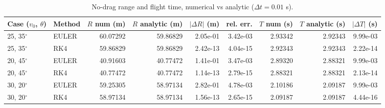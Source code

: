 \begin{table}[h]
\centering\small
\begin{tabular}{llrrrrrrr}
\hline
Case ($v_0$, $\theta$) & Method & $R$ num (m) & $R$ analytic (m) & $|\Delta R|$ (m) & rel. err. & $T$ num (s) & $T$ analytic (s) & $|\Delta T|$ (s) \\
\hline
25, 35$^\circ$ & EULER & 60.07292 & 59.86829 & 2.05e-01 & 3.42e-03 & 2.93342 & 2.92343 & 9.99e-03 \\
25, 35$^\circ$ & RK4 & 59.86829 & 59.86829 & 2.42e-13 & 4.04e-15 & 2.92343 & 2.92343 & 2.22e-14 \\
20, 45$^\circ$ & EULER & 40.91603 & 40.77472 & 1.41e-01 & 3.47e-03 & 2.89320 & 2.88321 & 9.99e-03 \\
20, 45$^\circ$ & RK4 & 40.77472 & 40.77472 & 1.14e-13 & 2.79e-15 & 2.88321 & 2.88321 & 2.13e-14 \\
30, 20$^\circ$ & EULER & 59.25305 & 58.97134 & 2.82e-01 & 4.78e-03 & 2.10186 & 2.09187 & 9.99e-03 \\
30, 20$^\circ$ & RK4 & 58.97134 & 58.97134 & 1.56e-13 & 2.65e-15 & 2.09187 & 2.09187 & 4.44e-16 \\
\hline
\end{tabular}
\caption{No-drag range and flight time, numerical vs analytic ($\Delta t = 0.01$ s).}
\label{tab:no_drag_comparison}
\end{table}
